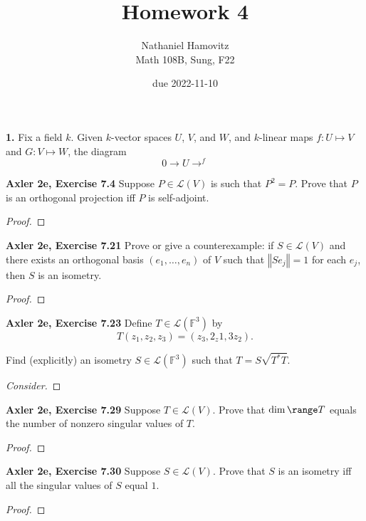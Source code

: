 \documentclass{article}
\newcommand{\F}{\mathbb{F}}
\newcommand{\paren}[1]{\left( #1 \right)}
\newcommand{\norm}[1]{\left\Vert #1 \right\Vert}
\newcommand{\lmap}[1]{\mathcal{L}\paren{#1}}
\begin{document}


\title{Homework 4} %
\author{Nathaniel Hamovitz\\Math 108B, Sung, F22}
\date{due 2022-11-10}

\maketitle


\textbf{1. }
Fix a field $k$. Given $k$-vector spaces $U$, $V$, and $W$, and $k$-linear maps $f: U \mapsto V$ and $G: V \mapsto W$, the diagram
$$0 \longrightarrow U \longrightarrow^{f}$$


\textbf{Axler 2e, Exercise 7.4}
Suppose $P \in \lmap{V}$ is such that $P^2 = P$. Prove that $P$ is an orthogonal projection iff $P$ is self-adjoint.
\begin{proof}
    
\end{proof}


\textbf{Axler 2e, Exercise 7.21}
Prove or give a counterexample: if $S \in \lmap{V}$ and there exists an orthogonal basis $(e_1, \dots, e_n)$ of $V$ such that $\norm{S e_j} = 1$ for each $e_j$, then $S$ is an isometry.
\begin{proof}%
    
\end{proof}


\textbf{Axler 2e, Exercise 7.23}
Define $T \in \lmap{\F^3}$ by
$$T(z_1, z_2, z_3) = (z_3, 2_z1, 3z_2).$$

Find (explicitly) an isometry $S \in \lmap{\F^3}$ such that $T = S\sqrt{T^* T}$.

\begin{proof}[Consider]
    
\end{proof}


\textbf{Axler 2e, Exercise 7.29}
Suppose $T \in \lmap{V}$. Prove that $\dim \range T$ equals the number of nonzero singular values of $T$.

\begin{proof}
    
\end{proof}


\textbf{Axler 2e, Exercise 7.30}
Suppose $S \in \lmap{V}$. Prove that $S$ is an isometry iff all the singular values of $S$ equal $1$.

\begin{proof}
    
\end{proof}
\end{document}
